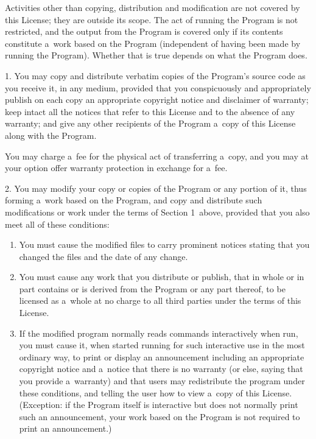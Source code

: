 \documentclass[a4paper, 11pt, twoside]{article}
\begin{document}
Activities other than copying, distribution and modification are not covered by this License; they are outside its scope. The act of running the Program is not restricted, and the output from the Program is covered only if its contents constitute a~work based on the Program (independent of having been made by running the Program). Whether that is true depends on what the Program does.

1. You may copy and distribute verbatim copies of the Program's source code as you receive it, in any medium, provided that you conspicuously and appropriately publish on each copy an appropriate copyright notice and disclaimer of warranty; keep intact all the notices that refer to this License and to the absence of any warranty; and give any other recipients of the Program a~copy of this License along with the Program.

You may charge a~fee for the physical act of transferring a~copy, and you may at your option offer warranty protection in exchange for a~fee.

2. You may modify your copy or copies of the Program or any portion of it, thus forming a~work based on the Program, and copy and distribute such modifications or work under the terms of Section 1~above, provided that you also meet all of these conditions:

\begin{enumerate}[label=\Alph*)]
\item You must cause the modified files to carry prominent notices stating that you changed the files and the date of any change.
\item You must cause any work that you distribute or publish, that in whole or in part contains or is derived from the Program or any part thereof, to be licensed as a~whole at no charge to all third parties under the terms of this License.
\item If the modified program normally reads commands interactively when run, you must cause it, when started running for such interactive use in the most ordinary way, to print or display an announcement including an appropriate copyright notice and a~notice that there is no warranty (or else, saying that you provide a~warranty) and that users may redistribute the program under these conditions, and telling the user how to view a~copy of this License. (Exception: if the Program itself is interactive but does not normally print such an announcement, your work based on the Program is not required to print an announcement.)
\end{enumerate}
\end{document}

